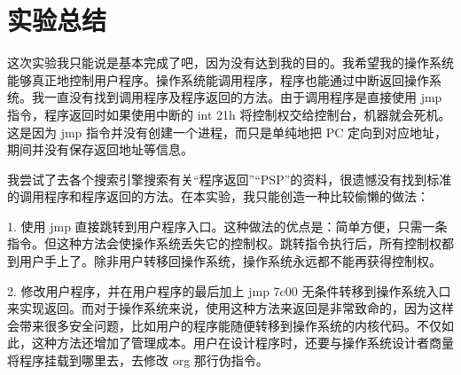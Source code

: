 \documentclass{article}
\begin{document}
\section{实验总结}

这次实验我只能说是基本完成了吧，因为没有达到我的目的。我希望我的操作系统能够真正地控制用户程序。操作系统能调用程序，程序也能通过中断返回操作系统。我一直没有找到调用程序及程序返回的方法。由于调用程序是直接使用 jmp 指令，程序返回时如果使用中断的 int 21h 将控制权交给控制台，机器就会死机。这是因为 jmp 指令并没有创建一个进程，而只是单纯地把 PC 定向到对应地址，期间并没有保存返回地址等信息。

我尝试了去各个搜索引擎搜索有关“程序返回”“PSP”的资料，很遗憾没有找到标准的调用程序和程序返回的方法。在本实验，我只能创造一种比较偷懒的做法：

1. 使用 jmp 直接跳转到用户程序入口。这种做法的优点是：简单方便，只需一条指令。但这种方法会使操作系统丢失它的控制权。跳转指令执行后，所有控制权都到用户手上了。除非用户转移回操作系统，操作系统永远都不能再获得控制权。

2. 修改用户程序，并在用户程序的最后加上 jmp 7c00 无条件转移到操作系统入口来实现返回。而对于操作系统来说，使用这种方法来返回是非常致命的，因为这样会带来很多安全问题，比如用户的程序能随便转移到操作系统的内核代码。不仅如此，这种方法还增加了管理成本。用户在设计程序时，还要与操作系统设计者商量将程序挂载到哪里去，去修改 org 那行伪指令。
\end{document}
